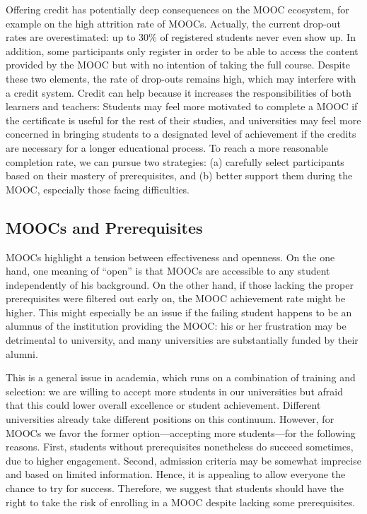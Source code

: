 Offering credit has potentially deep consequences on the MOOC
ecosystem, for example on the high attrition rate of MOOCs. Actually, the
current drop-out rates are overestimated: up to 30\% of registered students never
even show up. In addition, some participants only
register in order to be able to access the content provided by the MOOC
but with no intention of taking the full course. Despite these two
elements, the rate of drop-outs remains high, which may interfere with a
credit system. Credit can help because it increases the responsibilities
of both learners and teachers: Students may feel more motivated to complete a
MOOC if the certificate is useful for the rest of their
studies, and universities may feel more concerned in bringing students to
a designated level of achievement if the credits are necessary for a longer educational
process.  To reach a more reasonable completion rate, we can pursue two strategies:
(a)  carefully select participants based on their
mastery of prerequisites, and (b)  better support them during the MOOC,
especially those facing difficulties. 


\subsection{MOOCs and Prerequisites}

MOOCs highlight a tension between effectiveness and openness. 
On the one hand, one meaning of  ``open''  is that MOOCs are accessible to any
student independently of his background.  On the other hand,
if those lacking the proper prerequisites were filtered
out early on, the MOOC achievement rate might be higher. This might
especially be
an issue if the failing student happens to be an alumnus of the institution providing the
MOOC: his or her frustration may be detrimental to
university, and many universities are substantially funded by their alumni.

This is a general issue in academia, which runs on a combination of training and selection: we are willing to
accept more students in our universities but afraid that this could
lower overall excellence or student achievement.
Different universities already take different positions on this continuum. However,
for MOOCs we favor the former option---accepting more students---for the following reasons. 
First,  students without prerequisites nonetheless do succeed sometimes, due to higher
engagement. Second,  admission criteria may be somewhat
imprecise and based on limited information. Hence, it is appealing to allow
everyone the chance to try for success. Therefore, we suggest
that students should have the right to take the risk of enrolling in a MOOC despite lacking
some prerequisites. 


